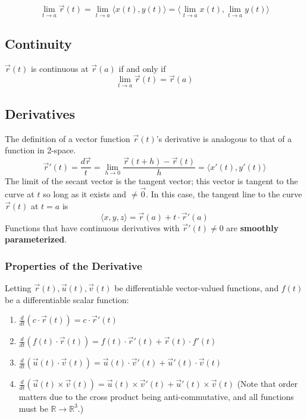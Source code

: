\documentclass{article}
\newcommand{\vect}[1]{\ensuremath{\overrightarrow{#1}}}
\begin{document}
$$\lim_{t\to{a}}\vect{r}(t)=\lim_{t\to{a}}\langle x(t),y(t) \rangle = \langle \lim_{t\to{a}}x(t),\lim_{t\to{a}}y(t) \rangle$$

\subsection{Continuity}
$\vect{r}(t)$ is continuous at $\vect{r}(a)$ if and only if $$\lim_{t\to{a}}\vect{r}(t)=\vect{r}(a)$$

\subsection{Derivatives}
The definition of a vector function $\vect{r}(t)$'s derivative is analogous to that of a function in 2-space.
$$\vect{r}'(t)=\frac{d\vect{r}}{t}=\lim_{h\to0}\frac{\vect{r}(t+h)-\vect{r}(t)}{h}=\langle x'(t), y'(t) \rangle$$
The limit of the secant vector is the tangent vector; this vector is tangent to the curve at $t$ so long as it exists and $\ne\vect{0}$. In this case, the tangent line to the curve $\vect{r}(t)$ at $t=a$ is
$$\langle x,y,z \rangle = \vect{r}(a)+t\cdot\vect{r}'(a)$$ Functions that have continuous derivatives with $\vect{r}'(t)\ne0$ are \textbf{smoothly parameterized}.

\subsubsection{Properties of the Derivative}
Letting $\vect{r}(t), \vect{u}(t), \vect{v}(t)$ be differentiable vector-valued functions, and $f(t)$ be a differentiable scalar function:
\begin{enumerate}
    \item $\frac{d}{dt}\left(c\cdot\vect{r}(t)\right)=c\cdot\vect{r}'(t)$
    \item $\frac{d}{dt}\left(f(t)\cdot\vect{r}(t)\right)=f(t)\cdot\vect{r}'(t)+\vect{r}(t)\cdot f'(t)$
    \item $\frac{d}{dt}\left(\vect{u}(t)\cdot\vect{v}(t)\right)=\vect{u}(t)\cdot\vect{v}'(t)+\vect{u}'(t)\cdot \vect{v}(t)$
    \item $\frac{d}{dt}\left(\vect{u}(t)\times\vect{v}(t)\right)=\vect{u}(t)\times\vect{v}'(t)+\vect{u}'(t)\times \vect{v}(t)$ (Note that order matters due to the cross product being anti-commutative, and all functions must be $\mathbb{R}\to\mathbb{R}^3$.)
\end{enumerate}
\end{document}
